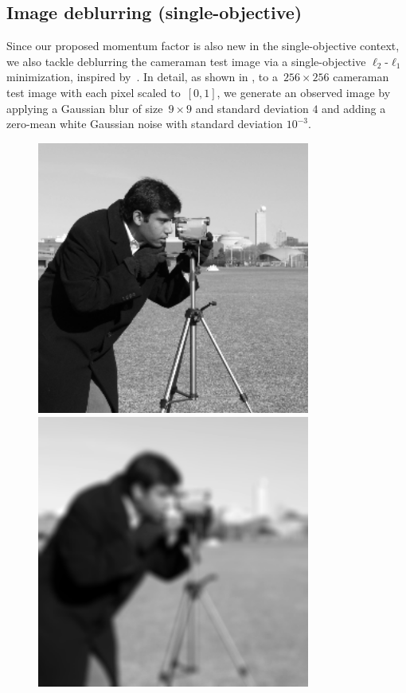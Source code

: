 \documentclass[../main]{subfiles}
\begin{document}
\subsection{Image deblurring (single-objective)}
Since our proposed momentum factor is also new in the single-objective context, we also tackle deblurring the cameraman test image via a single-objective $\ell_2$-$\ell_1$ minimization, inspired by~\cite{Beck2009}.
In detail, as shown in , to a~$256 \times 256$ cameraman test image with each pixel scaled to~$[0,1]$, we generate an observed image by applying a Gaussian blur of size~$9 \times 9$ and standard deviation $4$ and adding a zero-mean white Gaussian noise with standard deviation $10^{-3}$.
\begin{figure}[htpb]
    \centering
    \begin{minipage}[b]{.45\hsize}
        \centering
        \includegraphics[width=0.8\textwidth]{figs/cameraman_original.png}
    \end{minipage}
    \begin{minipage}[b]{.45\hsize}
        \centering
        \includegraphics[width=0.8\textwidth]{figs/cameraman_blurred_and_noisy.png}

\end{minipage}
\end{figure}
\end{document}

